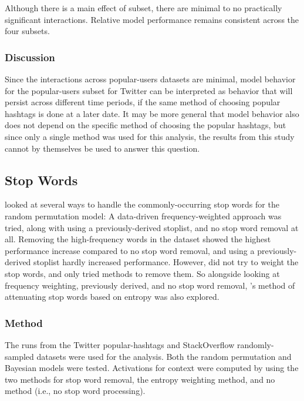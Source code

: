 \documentclass[man,floatsintext,donotrepeattitle]{apa6}
\begin{document}
Although there is a main effect of subset, there are minimal to no practically significant interactions.
Relative model performance remains consistent across the four subsets.

\subsubsection{Discussion}

Since the interactions across popular-users datasets are minimal, model behavior for the popular-users subset for Twitter can be interpreted as behavior that will persist across different time periods,
if the same method of choosing popular hashtags is done at a later date.
It may be more general that model behavior also does not depend on the specific method of choosing the popular hashtags, but since only a single method was used for this analysis,
the results from this study cannot by themselves be used to answer this question.

\subsection{Stop Words}

\textcite{Sahlgren2008} looked at several ways to handle the commonly-occurring stop words for the random permutation model:
A data-driven frequency-weighted approach was tried, along with using a previously-derived stoplist, and no stop word removal at all.
Removing the high-frequency words in the dataset showed the highest performance increase compared to no stop word removal, and using a previously-derived stoplist hardly increased performance.
However, \citeauthor{Sahlgren2008} did not try to weight the stop words, and only tried methods to remove them.
So alongside looking at frequency weighting, previously derived, and no stop word removal, \textcite{Stanley2013}'s method of attenuating stop words based on entropy was also explored.

\subsubsection{Method}

The runs from the Twitter popular-hashtags and StackOverflow randomly-sampled datasets were used for the analysis.
Both the random permutation and Bayesian models were tested.
Activations for context were computed by using the two methods for stop word removal, the entropy weighting method, and no method (i.e., no stop word processing).
\end{document}
